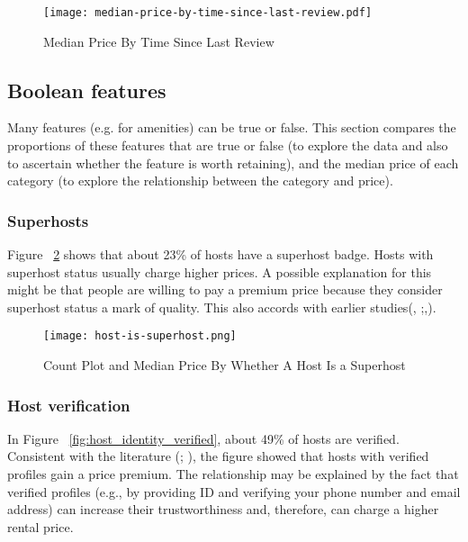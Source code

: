 \begin{figure}[!htbp]\centering
    \texttt{[image: median-price-by-time-since-last-review.pdf]}
        \caption{Median Price By Time Since Last Review}
        \label{fig:time_since_last_review_price}
\end{figure}

\subsection{Boolean features}
\label{sec:boolean_features}

Many features (e.g. for amenities) can be true or false. This section compares
the proportions of these features that are true or false (to explore the data
and also to ascertain whether the feature is worth retaining), and the median
price of each category (to explore the relationship between the category and
price).

\subsubsection*{Superhosts}

Figure ~\ref{fig:host_is_superhost} shows that about 23\% of hosts have a
superhost badge. Hosts with superhost status usually charge higher prices. A
possible explanation for this might be that people are willing to pay a premium
price because they consider superhost status a mark of quality.  This also
accords with earlier studies(\cite{gibbs2018use},
\cite{kakar2016effects};\cite{wang2017price},\cite{cai2019price}).

\begin{figure}[!htbp]\centering
    \texttt{[image: host-is-superhost.png]}
    \caption{Count Plot and Median Price By Whether A Host Is a Superhost}
    \label{fig:host_is_superhost}
\end{figure}

\subsubsection*{Host verification}
In Figure ~\ref{fig:host_identity_verified}, about 49\% of hosts are verified.
Consistent with the literature (\cite{chen2017consumer}; \cite{wang2017price}),
the figure showed that hosts with verified profiles gain a price premium. The
relationship may be explained by the fact that verified profiles (e.g., by
providing ID and verifying your phone number and email address)  can increase
their trustworthiness and, therefore, can charge a higher rental price.

